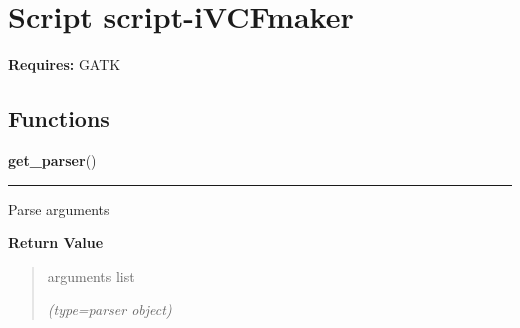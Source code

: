 %
%
%


\section{Script script-iVCFmaker}

    \label{script-iVCFmaker}
\textbf{Requires:} GATK





  \subsection{Functions}

    \label{script-iVCFmaker:get_parser}

    \vspace{0.5ex}

\hspace{.8\funcindent}\begin{boxedminipage}{\funcwidth}

    \raggedright \textbf{get\_parser}()

    \vspace{-1.5ex}

    \rule{\textwidth}{0.5\fboxrule}
\setlength{\parskip}{2ex}
    Parse arguments

\setlength{\parskip}{1ex}
      \textbf{Return Value}
    \vspace{-1ex}

      \begin{quote}
      arguments list

      {\it (type=parser object)}

      \end{quote}

    \end{boxedminipage}

